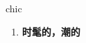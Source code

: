 
\begin{frame}
{\huge chic}
\begin{center}
\begin{enumerate}\Large
  \item \textbf{时髦的，潮的}
\end{enumerate}
\end{center}
\end{frame}
